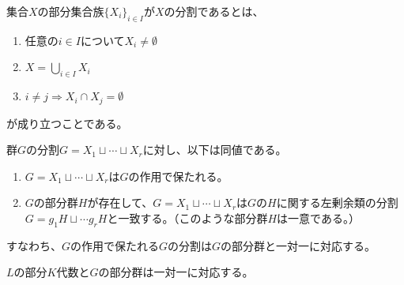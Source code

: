 \begin{definition}
    \label{decomposition-def}
    \leanok    
    集合$X$の部分集合族$\{X_i\}_{i\in I}$が$X$の分割であるとは、
    \begin{enumerate}
        \item 任意の$i\in I$について$X_i\neq\emptyset$
        \item $X=\bigcup_{i\in I}X_i$
        \item $i\neq j\Rightarrow X_i\cap X_j=\emptyset$
    \end{enumerate}
    が成り立つことである。
\end{definition}

\begin{proposition}\label{group-decomp}
    群$G$の分割$G=X_1\sqcup\cdots\sqcup X_r$に対し、以下は同値である。
    \begin{enumerate}
        \item $G=X_1\sqcup\cdots\sqcup X_r$は$G$の作用で保たれる。
        \item $G$の部分群$H$が存在して、$G=X_1\sqcup\cdots\sqcup X_r$は$G$の$H$に関する左剰余類の分割$G=g_1H\sqcup\cdots g_rH$と一致する。（このような部分群$H$は一意である。）
    \end{enumerate}
    すなわち、$G$の作用で保たれる$G$の分割は$G$の部分群と一対一に対応する。
\end{proposition}

\begin{theorem}\label{main}
    $L$の部分$K$代数と$G$の部分群は一対一に対応する。
\end{theorem}